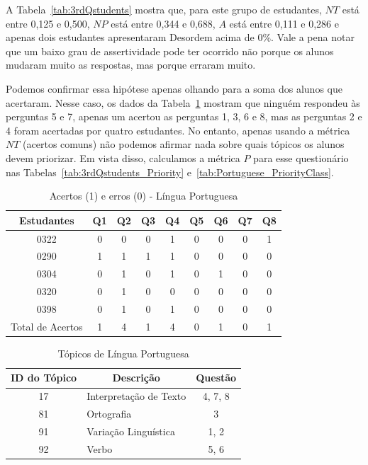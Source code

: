 A Tabela~\ref{tab:3rdQstudents} mostra que, para este grupo de estudantes, $NT$ está entre 0,125 e 0,500, $NP$ está entre 0,344 e 0,688, $A$ está entre 0,111 e 0,286 e apenas dois estudantes apresentaram Desordem acima de 0\%.
Vale a pena notar que um baixo grau de assertividade pode ter ocorrido não porque os alunos mudaram muito as respostas, mas porque erraram muito.

Podemos confirmar essa hipótese apenas olhando para a soma dos alunos que acertaram. Nesse caso, os dados da Tabela~\ref{tab:3rdHitsMisses} mostram que ninguém respondeu às perguntas 5 e 7, apenas um acertou as perguntas 1, 3, 6 e 8, mas as perguntas 2 e 4 foram acertadas por quatro estudantes. No entanto, apenas usando a métrica $NT$ (acertos comuns) não podemos afirmar nada sobre quais tópicos os alunos devem priorizar. Em vista disso, calculamos a métrica $P$ para esse questionário nas Tabelas~\ref{tab:3rdQstudents_Priority} e~\ref{tab:Portuguese_PriorityClass}.

\begin{table}[htbp]
\caption{Acertos (1) e erros (0) - Língua Portuguesa}
\centering
\begin{tabular}{|c|c|c|c|c|c|c|c|c|}
\hline
\multicolumn{1}{|c|}{\textbf{Estudantes}} & \textbf{Q1} & \textbf{Q2} & \textbf{Q3} & \textbf{Q4} & \textbf{Q5} & \textbf{Q6} & \textbf{Q7} & \textbf{Q8} \\ \hline
0322 & 0 & 0 & 0 & 1 & 0 & 0 & 0 & 1 \\ \hline
0290 & 1 & 1 & 1 & 1 & 0 & 0 & 0 & 0 \\ \hline
0304 & 0 & 1 & 0 & 1 & 0 & 1 & 0 & 0 \\ \hline
0320 & 0 & 1 & 0 & 0 & 0 & 0 & 0 & 0 \\ \hline
0398 & 0 & 1 & 0 & 1 & 0 & 0 & 0 & 0 \\ \hline
Total de Acertos & 1 & 4 & 1 & 4 & 0 & 1 & 0 & 1 \\ \hline
\end{tabular}
\label{tab:3rdHitsMisses}
\end{table}

\begin{table}[htbp]
\caption{Tópicos de Língua Portuguesa}
\centering
\begin{tabular}{|c|l|c|}
\hline
\textbf{ID do Tópico} & \multicolumn{1}{c|}{\textbf{Descrição}} & \textbf{Questão} \\ \hline
17 & Interpretação de Texto & 4, 7, 8 \\ \hline
81 & Ortografia & 3\\ \hline
91 & Variação Linguística & 1, 2 \\ \hline
92 & Verbo & 5, 6\\ \hline
\end{tabular}
\label{tab:3rdQstudents_Topic}
\end{table}

